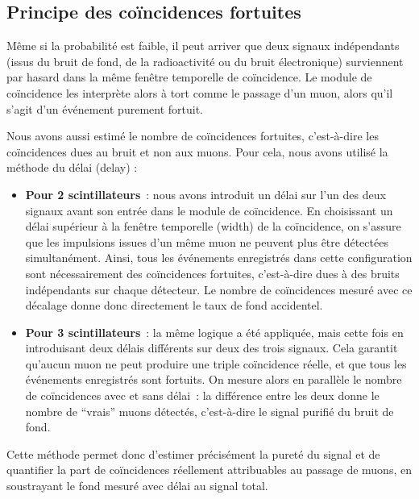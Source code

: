 \documentclass[a4paper,12pt,twoside]{article}
\begin{document}
\subsection{Principe des coïncidences fortuites}

\begin{center}
\begin{tcolorbox}[colback=blue!5!white, colframe=blue!60!black, title=Principe des coïncidences fortuites]
Même si la probabilité est faible, il peut arriver que deux signaux indépendants (issus du bruit de fond, de la radioactivité ou du bruit électronique) surviennent par hasard dans la même fenêtre temporelle de coïncidence. Le module de coïncidence les interprète alors à tort comme le passage d’un muon, alors qu’il s’agit d’un événement purement fortuit.
\end{tcolorbox}
\end{center}

Nous avons aussi estimé le nombre de coïncidences fortuites, c’est-à-dire les coïncidences dues au bruit et non aux muons. Pour cela, nous avons utilisé la méthode du délai (delay) :

\begin{itemize}
    \item \textbf{Pour 2 scintillateurs}~: nous avons introduit un délai sur l’un des deux signaux avant son entrée dans le module de coïncidence. En choisissant un délai supérieur à la fenêtre temporelle (width) de la coïncidence, on s’assure que les impulsions issues d’un même muon ne peuvent plus être détectées simultanément. Ainsi, tous les événements enregistrés dans cette configuration sont nécessairement des coïncidences fortuites, c’est-à-dire dues à des bruits indépendants sur chaque détecteur. Le nombre de coïncidences mesuré avec ce décalage donne donc directement le taux de fond accidentel.
    \item \textbf{Pour 3 scintillateurs}~: la même logique a été appliquée, mais cette fois en introduisant deux délais différents sur deux des trois signaux. Cela garantit qu’aucun muon ne peut produire une triple coïncidence réelle, et que tous les événements enregistrés sont fortuits. On mesure alors en parallèle le nombre de coïncidences avec et sans délai~: la différence entre les deux donne le nombre de “vrais” muons détectés, c’est-à-dire le signal purifié du bruit de fond.
\end{itemize}

Cette méthode permet donc d’estimer précisément la pureté du signal et de quantifier la part de coïncidences réellement attribuables au passage de muons, en soustrayant le fond mesuré avec délai au signal total.
\end{document}

